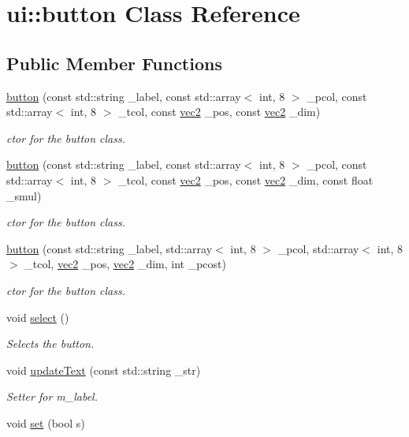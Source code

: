\hypertarget{classui_1_1button}{\section{ui\-:\-:button Class Reference}
\label{classui_1_1button}
}
\subsection*{Public Member Functions}
\begin{DoxyCompactItemize}
\item 
\hyperlink{classui_1_1button_aa6e3eea4dcc22983d7ae1b0b0121850f}{button} (const std\-::string \-\_\-label, const std\-::array$<$ int, 8 $>$ \-\_\-pcol, const std\-::array$<$ int, 8 $>$ \-\_\-tcol, const \hyperlink{structvec2}{vec2} \-\_\-pos, const \hyperlink{structvec2}{vec2} \-\_\-dim)
\begin{DoxyCompactList}\small\item\em ctor for the button class. \end{DoxyCompactList}\item 
\hyperlink{classui_1_1button_aaa5b4acc8a3088a7dbc18612c4b7f165}{button} (const std\-::string \-\_\-label, const std\-::array$<$ int, 8 $>$ \-\_\-pcol, const std\-::array$<$ int, 8 $>$ \-\_\-tcol, const \hyperlink{structvec2}{vec2} \-\_\-pos, const \hyperlink{structvec2}{vec2} \-\_\-dim, const float \-\_\-smul)
\begin{DoxyCompactList}\small\item\em ctor for the button class. \end{DoxyCompactList}\item 
\hyperlink{classui_1_1button_a3a8746c1243b69585e68c546ad5c769a}{button} (const std\-::string \-\_\-label, std\-::array$<$ int, 8 $>$ \-\_\-pcol, std\-::array$<$ int, 8 $>$ \-\_\-tcol, \hyperlink{structvec2}{vec2} \-\_\-pos, \hyperlink{structvec2}{vec2} \-\_\-dim, int \-\_\-pcost)
\begin{DoxyCompactList}\small\item\em ctor for the button class. \end{DoxyCompactList}\item 
\hypertarget{classui_1_1button_a45aefd446962e88d8f4c0826ae5709ec}{void \hyperlink{classui_1_1button_a45aefd446962e88d8f4c0826ae5709ec}{select} ()}\label{classui_1_1button_a45aefd446962e88d8f4c0826ae5709ec}

\begin{DoxyCompactList}\small\item\em Selects the button. \end{DoxyCompactList}\item 
void \hyperlink{classui_1_1button_a8068afa66f15f7fa29ab5dadbff88909}{update\-Text} (const std\-::string \-\_\-str)
\begin{DoxyCompactList}\small\item\em Setter for m\-\_\-label. \end{DoxyCompactList}\item 
\hypertarget{classui_1_1button_a85fb38ca3fbf644d64829145f2d6f588}{void \hyperlink{classui_1_1button_a85fb38ca3fbf644d64829145f2d6f588}{set} (bool s)}\label{classui_1_1button_a85fb38ca3fbf644d64829145f2d6f588}


\end{DoxyCompactItemize}
